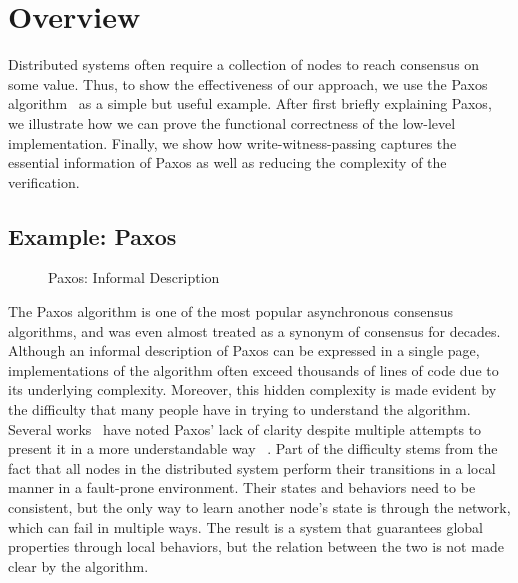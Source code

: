 \section{Overview}
\label{sec:overview}

Distributed systems often require a collection of nodes to reach consensus on some value.
Thus, to show the effectiveness of our approach,
we use the Paxos algorithm~\cite{paxos} as a simple but useful example.
After first briefly explaining Paxos, we illustrate how we can prove the functional correctness of the low-level implementation.
Finally, we show how write-witness-passing captures the essential information of Paxos as well as
reducing the complexity of the verification.

\subsection{Example: Paxos} 
\label{subsec:paxos} 

\begin{figure}
\begin{minipage}{\linewidth}
\noindent
\begin{multicols}{2}

\end{multicols}
\end{minipage}
\caption{Paxos: Informal Description}
\label{fig:paxos-pseudocode}
\end{figure}

The Paxos algorithm is one of the most popular asynchronous consensus algorithms, and was even almost treated as a synonym of
consensus for decades.
Although an informal description of Paxos can be expressed in a single page,
implementations of the algorithm often exceed thousands of lines of code due to its underlying complexity.
Moreover, this hidden complexity is made evident by the difficulty that many people have in trying to understand the algorithm.
Several works~\cite{raft, rvrpaxos} have noted Paxos' lack of clarity despite multiple attempts to present
it in a more understandable way ~\cite{paxosmadesimple, Lampson1996, Lampson2001, dpaxos}.
Part of the difficulty stems from the fact that all nodes in the distributed system perform their transitions in a local manner in a fault-prone environment.
Their states and behaviors need to be consistent, but
the only way to learn another node's state is through the network, which can fail in multiple ways.
The result is a system that guarantees global properties through local behaviors, but the relation between the two is not made clear by the algorithm.

